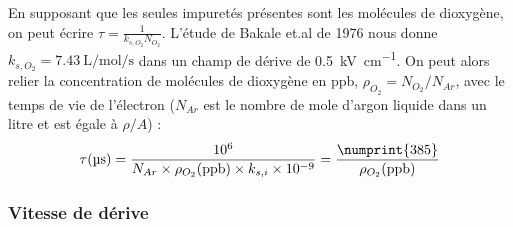         En supposant que les seules impuretés présentes sont les molécules de dioxygène, on peut écrire $\tau = \frac{1}{k_{s,O_2} N_{O_2}}$. L'étude de Bakale et.al de 1976\cite{Bakale1976} nous donne $k_{s,O_2}=\SI{7.43}{\liter\per\mole\per\second}$ dans un champ de dérive de \SI{0.5}{\kilo\volt\per\centi\meter}. On peut alors relier la concentration de molécules de dioxygène en ppb, $\rho_{O_2}=N_{O_2}/N_{Ar}$, avec le temps de vie de l'électron ($N_{Ar}$ est le nombre de mole d'argon liquide dans un litre et est égale à $\rho/A$) : 
        \begin{equation}
          \tau(\si{\micro\second}) = \frac{10^6}{N_{Ar}\times \rho_{O_2}(\si{ppb}) \times k_{s,i} \times 10^{-9}} = \frac{\numprint{385}}{\rho_{O_2}(\si{ppb})}\label{eq::purity}
        \end{equation}
        

      \subsubsection{Vitesse de dérive}

